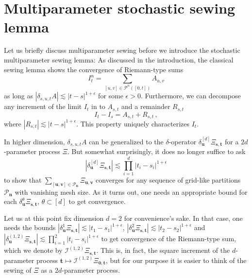 \documentclass[11pt,oneside,english,reqno]{amsart}
\numberwithin{equation}{section}
\numberwithin{figure}{section}
\theoremstyle{plain}
\theoremstyle{definition}
\theoremstyle{remark}
\theoremstyle{plain}
\theoremstyle{plain}
\theoremstyle{plain}
\theoremstyle{plain}
\theoremstyle{plain}
\newcommand{\cI}{\mathcal{I}}
\newcommand{\cP}{\mathcal{P}}
\newcommand{\bn}{\mathbf{n}}
\newcommand{\boo}{\mathbf{0}}
\newcommand{\bu}{\mathbf{u}}
\newcommand{\bv}{\mathbf{v}}
\newcommand{\bs}{\mathbf{s}}
\newcommand{\bt}{\mathbf{t}}
\newcommand{\abs}[1]{\left\lvert #1\right\rvert}
\begin{document}
\section{Multiparameter stochastic sewing lemma}
\label{sewing section}

\noindent Let us briefly discuss multiparameter sewing before we introduce the stochastic multiparameter sewing lemma: As discussed in the introduction, the classical sewing lemma shows the convergence of Riemann-type sums
%
\begin{equation*}
    I^n_t = \sum_{[u,v]\in\cP^n([0,t])}A_{u,v}
\end{equation*}
%
as long as $\abs{\delta_{s,u,t} A}\lesssim \abs{t-s}^{1+\epsilon}$ for some $\epsilon > 0$. Furthermore, we can decompose any increment of the limit $I_t$ in to $A_{s,t}$ and a remainder $R_{s,t}$
%
\begin{equation*}
    I_t-I_s = A_{s,t} +R_{s,t}\,,
\end{equation*}
%
where $\abs{R_{s,t}}\lesssim \abs{t-s}^{1+\epsilon}$. This property uniquely characterizes $I_t$.

In higher dimension, $\delta_{s,u,t} A$ can be generalized to the $\delta$-operator $\delta^{[d]}_\bu\Xi_{\bs,\bt}$ for a $2d$-parameter process $\Xi$. But somewhat surprisingly, it does no longer suffice to ask 
%
\begin{equation*}
    \abs{\delta^{[d]}_\bu \Xi_{\bs,\bt}}\lesssim \prod_{i=1}^d \abs{t_i-s_i}^{1+\epsilon}
\end{equation*}
%
to show that $\sum_{[\bu,\bv]\in\cP_\bn}\Xi_{\bu,\bv}$ converges for any sequence of grid-like partitions $\cP_\bn$ with vanishing mesh size. As it turns out, one needs an appropriate bound for each $\delta^\theta_\bu\Xi_{\bs,\bt}$, $\theta\subset[d]$ to get convergence.

Let us at this point fix dimension $d=2$ for convenience's sake. In that case, one needs the bounds $\abs{\delta^1_\bu\Xi_{\bs,\bt}} \lesssim \abs{t_1-s_1}^{1+\epsilon}$, $\abs{\delta^2_\bu\Xi_{\bs,\bt}} \lesssim \abs{t_2-s_2}^{1+\epsilon}$ and $\abs{\delta^{(1,2)}_\bu\Xi_{\bs,\bt}} \lesssim \prod_{i=1}^2\abs{t_i-s_i}^{1+\epsilon}$ to get convergence of the Riemann-type sum, which we denote by $\cI^{(1,2)}\Xi_{\bs,\bt}$. This is, in fact, the square increment of the $d$-parameter process $\bt\mapsto \cI^{(1,2)}\Xi_{\boo,\bt}$, but for our purpose it is easier to think of the sewing of $\Xi$ as a $2d$-parameter process.
\end{document}
